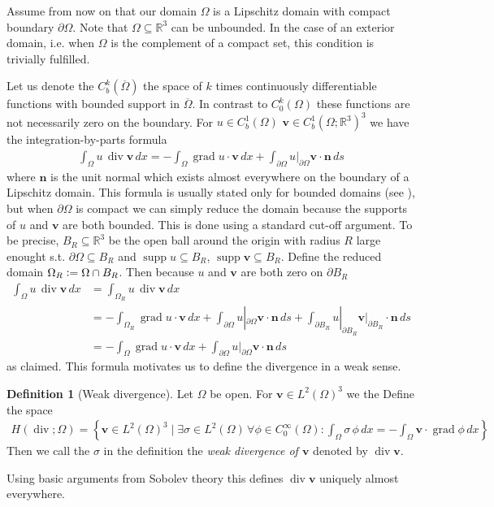 \documentclass[12pt,a4paper]{article}
\numberwithin{equation}{subsection}
\numberwithin{lemma}{subsection}
\theoremstyle{definition}
\newtheorem{definition}[lemma]{Definition}
\DeclareMathOperator{\diver}{div}
\DeclareMathOperator{\grad}{grad}
\DeclareMathOperator{\supp}{supp}
\newcommand{\real}{\mathbb{R}}
\begin{document}
Assume from now on that our domain $\Omega$ is a Lipschitz domain 
with compact boundary $\partial \Omega$. Note that $\Omega \subseteq \real^3$ 
can be unbounded. In the case of an exterior domain, i.e. when $\Omega$ is 
the complement of a compact set, this condition is trivially fulfilled.

Let us denote the $C^k_b(\overline{\Omega})$ the space of $k$ times continuously
differentiable functions with bounded support in $\overline{\Omega}$. 
In contrast to $C^k_0(\Omega)$ these functions are not necessarily zero on the 
boundary.
For $u \in C_b^1(\Omega)$ $\mathbf{v} \in C_b^1(\Omega;\real^3)^3$ we 
have the integration-by-parts formula
\begin{align}
    \int_\Omega u \, \diver \mathbf{v} \, dx
    = - \int_\Omega \grad u \cdot \mathbf{v} \, dx
        + \int_{\partial \Omega} u|_{\partial \Omega} \mathbf{v}\cdot\mathbf{n} \, ds
        \label{eq:integration_by_parts_C1}
\end{align}
where $\mathbf{n}$ is the unit normal which exists almost everywhere on the boundary of a 
Lipschitz domain. This formula is usually stated only for 
bounded domains (see \cite[Cor.\,3.20]{monk}), but when $\partial \Omega$ is compact 
we can simply reduce the domain 
because the supports of $u$ and $\mathbf{v}$ are both bounded. This is done using 
a standard cut-off argument.
To be precise, $B_R \subseteq \real^3$ be the open ball around the origin 
with radius $R$ large enought s.t. $\partial \Omega \subseteq B_R$ and 
$\supp u \subseteq B_R$, $\supp \mathbf{v} \subseteq B_R$.
Define the reduced domain $\Omega_R \vcentcolon= \Omega \cap B_R$. 
Then because $u$ and $\mathbf{v}$ are both zero on $\partial B_R$
\begin{align*}
    \int_\Omega u \, \diver \mathbf{v} \, dx
    &= \int_{\Omega_R} u \, \diver \mathbf{v} \, dx
    \\ &= - \int_{\Omega_R} \grad u \cdot \mathbf{v} \, dx
        + \int_{\partial \Omega} u|_{\partial \Omega} \mathbf{v}\cdot\mathbf{n} \, ds
        + \int_{\partial B_R} u|_{\partial B_R} \mathbf{v}|_{\partial B_R} \cdot\mathbf{n} \, ds
    \\ &= - \int_\Omega \grad u \cdot \mathbf{v} \, dx
        + \int_{\partial \Omega} u|_{\partial \Omega} \mathbf{v}\cdot\mathbf{n} \, ds
\end{align*}
as claimed. This formula motivates us to define the divergence in a
weak sense.

\begin{definition}[Weak divergence]
    Let $\Omega$ be open. For $\mathbf{v} \in L^2(\Omega)^3$ we the  
    Define the space
    \begin{align*}
        H(\diver;\Omega) = \left\{ \mathbf{v} \in L^2(\Omega)^3 \mid
            \exists \sigma \in L^2(\Omega)\, \forall \phi \in C_0^\infty(\Omega) :  
            \int_\Omega \sigma \, \phi \, dx = -\int_\Omega \mathbf{v} \cdot \grad \phi \, dx \right\}
    \end{align*}
    Then we call the $\sigma$ in the definition the \textit{weak divergence of $\mathbf{v}$}
    denoted by $\diver \mathbf{v}$.
\end{definition}
Using basic arguments from Sobolev theory this defines $\diver \mathbf{v}$ 
uniquely almost everywhere. 
\end{document}
